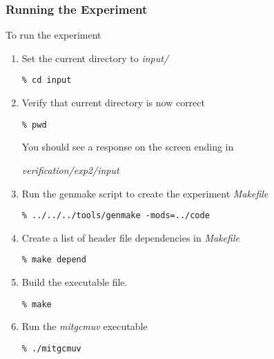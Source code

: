 \subsubsection{Running the Experiment}

 To run the experiment

\begin{enumerate}
\item Set the current directory to {\it input/ }

\begin{verbatim}
% cd input
\end{verbatim}

\item Verify that current directory is now correct

\begin{verbatim}
% pwd
\end{verbatim}

 You should see a response on the screen ending in

{\it verification/exp2/input }


\item Run the genmake script to create the experiment {\it Makefile}

\begin{verbatim}
% ../../../tools/genmake -mods=../code
\end{verbatim}

\item Create a list of header file dependencies in {\it Makefile}

\begin{verbatim}
% make depend
\end{verbatim}

\item Build the executable file.

\begin{verbatim}
% make
\end{verbatim}

\item Run the {\it mitgcmuv} executable

\begin{verbatim}
% ./mitgcmuv
\end{verbatim}

\end{enumerate}


